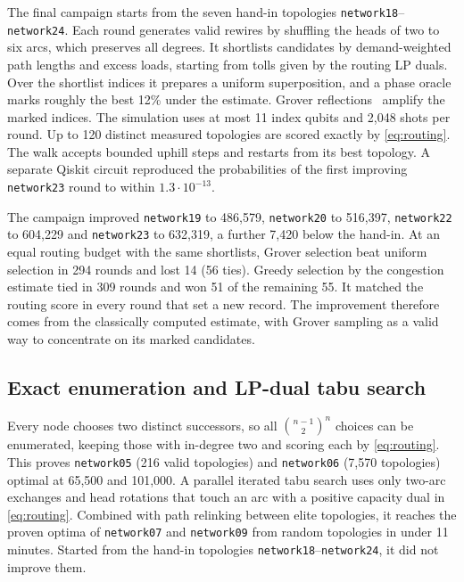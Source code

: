 \documentclass[a4paper]{article}
\begin{document}
The final campaign starts from the seven hand-in topologies \texttt{network18}--\texttt{network24}.
Each round generates valid rewires by shuffling the heads of two to six arcs, which preserves all degrees.
It shortlists candidates by demand-weighted path lengths and excess loads, starting from tolls given by the routing LP duals.
Over the shortlist indices it prepares a uniform superposition, and a phase oracle marks roughly the best 12\% under the estimate.
Grover reflections~\cite{grover} amplify the marked indices. The simulation uses at most 11 index qubits and 2,048 shots per round.
Up to 120 distinct measured topologies are scored exactly by \eqref{eq:routing}. The walk accepts bounded uphill steps and restarts
from its best topology. A separate Qiskit circuit reproduced the probabilities of the first improving \texttt{network23} round
to within \(1.3\cdot10^{-13}\).

The campaign improved \texttt{network19} to 486,579, \texttt{network20} to 516,397, \texttt{network22} to 604,229 and
\texttt{network23} to 632,319, a further 7,420 below the hand-in. At an equal routing budget with the same shortlists,
Grover selection beat uniform selection in 294 rounds and lost 14 (56 ties).
Greedy selection by the congestion estimate tied in 309 rounds and won 51 of the remaining 55.
It matched the routing score in every round that set a new record. The improvement therefore comes from the
classically computed estimate, with Grover sampling as a valid way to concentrate on its marked candidates.

\subsection{Exact enumeration and LP-dual tabu search}

Every node chooses two distinct successors, so all \(\binom{n-1}{2}^n\) choices can be enumerated, keeping those
with in-degree two and scoring each by \eqref{eq:routing}. This proves \texttt{network05} (216 valid topologies) and
\texttt{network06} (7,570 topologies) optimal at 65,500 and 101,000. A parallel iterated tabu search uses only
two-arc exchanges and head rotations that touch an arc with a positive capacity dual in \eqref{eq:routing}.
Combined with path relinking between elite topologies, it reaches the proven optima of \texttt{network07} and \texttt{network09}
from random topologies in under 11 minutes. Started from the hand-in topologies \texttt{network18}--\texttt{network24}, it did not improve them.
\end{document}
